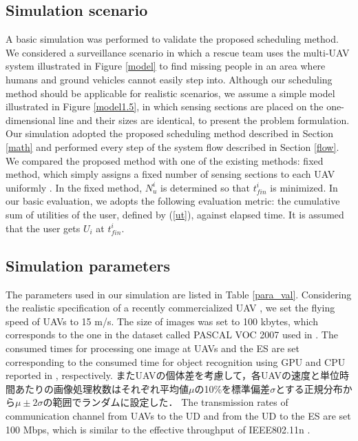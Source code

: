 \documentclass{ieeeaccess}
\begin{document}
\subsection{Simulation scenario}
A basic simulation was performed to validate the proposed scheduling method.
%
We considered a surveillance scenario in which a rescue team uses the multi-UAV system illustrated in Figure \ref{model} to find missing people in an area where humans and ground vehicles cannot easily step into.
%
Although our scheduling method should be applicable for realistic scenarios, we assume a simple model illustrated in Figure \ref{model1.5}, in which sensing sections are placed on the one-dimensional line and their sizes are identical, to present the problem formulation.
%
Our simulation adopted the proposed scheduling method described in Section \ref{math} and performed every step of the system flow described in Section \ref{flow}.
%
We compared the proposed method with one of the existing methods: fixed method, which simply assigns a fixed number of sensing sections to each UAV uniformly \cite{chang2016}.
In the fixed method, $N_u^i$ is determined so that $t_{fin}^i$ is minimized.
%
In our basic evaluation, we adopts the following evaluation metric: the cumulative sum of utilities of the user, defined by (\ref{ut}), against elapsed time.
It is assumed that the user gets $U_i$ at $t_{fin}^i$.

\subsection{Simulation parameters}

The parameters used in our simulation are listed in Table \ref{para_val}.
%
Considering the realistic specification of a recently commercialized UAV \cite{bebop2}, we set the flying speed of UAVs to 15 m/s.
%
The size of images was set to 100 kbytes, which corresponds to the one in the dataset called PASCAL VOC 2007 used in \cite{Ren2015}.
%
The consumed times for processing one image at UAVs and the ES are set corresponding to the consumed time for object recognition using GPU and CPU reported in \cite{Ren2015}, respectively.
またUAVの個体差を考慮して，各UAVの速度と単位時間あたりの画像処理枚数はそれぞれ平均値$\mu$の10\%を標準偏差$\sigma$とする正規分布から$\mu{\pm}2{\sigma}$の範囲でランダムに設定した．
%
The transmission rates of communication channel from UAVs to the UD and from the UD to the ES are set 100 Mbps, which is similar to the effective throughput of IEEE802.11n \cite{Li2013}.
%
\end{document}
